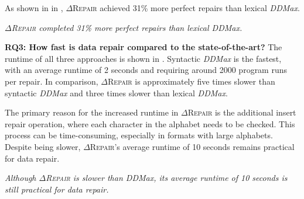 \documentclass[sigconf,review,anonymous]{acmart}
\newenvironment{result}{\begin{framed}\centering\it}{\end{framed}}
\newcommand{\dtask}{data repair\xspace}
\newcommand{\approach}{\textsc{$\Delta$Repair}\xspace}
\newcommand{\ddmax}{\textit{DDMax}\xspace}
\newcommand{\drepair}{\approach}
\begin{document}
As shown in in ,
\drepair achieved 31\% more perfect repairs than lexical \ddmax.


\begin{result}
\drepair completed 31\% more perfect repairs than lexical \ddmax.
\end{result}


\noindent\textbf{RQ3: How fast is \dtask compared to the state-of-the-art?}
The runtime of all three approaches is shown in .
Syntactic \ddmax is the fastest, with an average runtime of 2 seconds and
requiring around 2000 program runs per repair.
In comparison, \drepair is approximately five times slower than syntactic
\ddmax and three times slower than lexical \ddmax.

The primary reason for the increased runtime in \drepair is the additional
insert repair operation, where each character in the alphabet needs to be
checked. This process can be time-consuming, especially in formats with
large alphabets.
Despite being slower, \drepair's average runtime of 10 seconds remains practical
for \dtask.

\begin{result}
Although \drepair is slower than \ddmax, its average runtime of 10 seconds is
still practical for \dtask.
\end{result}
\end{document}
